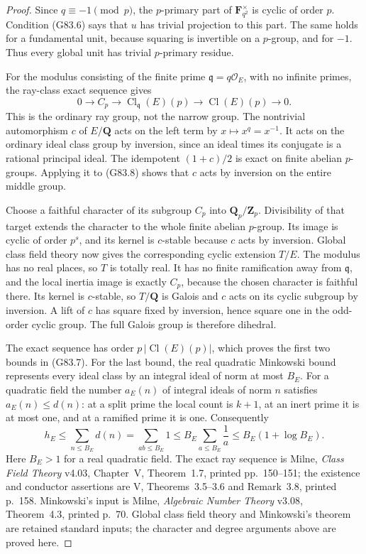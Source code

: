 \begin{proof}
Since \(q\equiv-1\pmod p\), the \(p\)-primary part of
\(\mathbf F_{q^2}^{\times}\) is cyclic of order \(p\).
Condition (G83.6) says that \(u\) has trivial projection to
this part.  The same holds for a fundamental unit, because
squaring is invertible on a \(p\)-group, and for \(-1\).
Thus every global unit has trivial \(p\)-primary residue.

For the modulus consisting of the finite prime
\(\mathfrak q=q\mathcal O_E\), with no infinite primes, the
ray-class exact sequence gives
\[
 0\longrightarrow C_p\longrightarrow
       \operatorname{Cl}_{\mathfrak q}(E)(p)
       \longrightarrow\operatorname{Cl}(E)(p)
       \longrightarrow0.                         \tag{G83.8}
\]
This is the ordinary ray group, not the narrow group.
The nontrivial automorphism \(c\) of \(E/\mathbf Q\) acts on
the left term by \(x\mapsto x^q=x^{-1}\).
It acts on the ordinary ideal class group by inversion,
since an ideal times its conjugate is a rational principal
ideal.  The idempotent \((1+c)/2\) is exact on finite abelian
\(p\)-groups.  Applying it to (G83.8) shows that \(c\) acts
by inversion on the entire middle group.

Choose a faithful character of its subgroup \(C_p\) into
\(\mathbf Q_p/\mathbf Z_p\).
Divisibility of that target extends the character to the
whole finite abelian \(p\)-group.  Its image is cyclic of
order \(p^s\), and its kernel is \(c\)-stable because \(c\)
acts by inversion.
Global class field theory now gives the corresponding
cyclic extension \(T/E\).  The modulus has no real places,
so \(T\) is totally real.  It has no finite ramification
away from \(\mathfrak q\), and the local inertia image is
exactly \(C_p\), because the chosen character is faithful
there.  Its kernel is \(c\)-stable, so \(T/\mathbf Q\) is
Galois and \(c\) acts on its cyclic subgroup by inversion.
A lift of \(c\) has square fixed by inversion, hence square
one in the odd-order cyclic group.  The full Galois group
is therefore dihedral.

The exact sequence has order \(p\,|\operatorname{Cl}(E)(p)|\),
which proves the first two bounds in (G83.7).
For the last bound, the real quadratic Minkowski bound
represents every ideal class by an integral ideal of norm
at most \(B_E\).  For a quadratic field the number \(a_E(n)\)
of integral ideals of norm \(n\) satisfies \(a_E(n)\le d(n)\):
at a split prime the local count is \(k+1\), at an inert
prime it is at most one, and at a ramified prime it is one.
Consequently
\[
 h_E\le\sum_{n\le B_E}d(n)
      =\sum_{ab\le B_E}1
      \le B_E\sum_{a\le B_E}\frac1a
      \le B_E(1+\log B_E).
\]
Here \(B_E>1\) for a real quadratic field.
The exact ray sequence is Milne, \emph{Class Field Theory}
v4.03, Chapter~V, Theorem~1.7, printed pp.~150--151;
the existence and conductor assertions are V, Theorems~3.5--3.6
and Remark~3.8, printed p.~158.
Minkowski's input is Milne, \emph{Algebraic Number Theory}
v3.08, Theorem~4.3, printed p.~70.
Global class field theory and Minkowski's theorem are
retained standard inputs; the character and degree
arguments above are proved here.
\end{proof}

